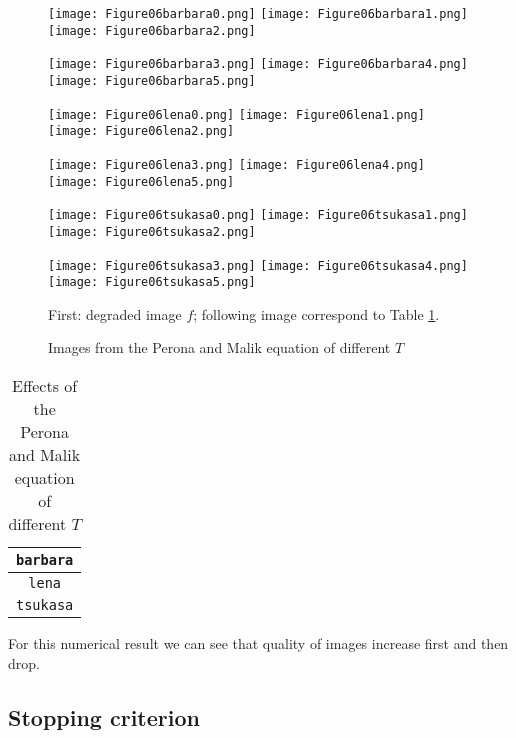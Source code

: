 \documentclass[english, nochinese]{pnote}
\begin{document}
\begin{figure}[htbp]
{
\centering

\texttt{[image: Figure06barbara0.png]}
\texttt{[image: Figure06barbara1.png]}
\texttt{[image: Figure06barbara2.png]}

\texttt{[image: Figure06barbara3.png]}
\texttt{[image: Figure06barbara4.png]}
\texttt{[image: Figure06barbara5.png]}

\texttt{[image: Figure06lena0.png]}
\texttt{[image: Figure06lena1.png]}
\texttt{[image: Figure06lena2.png]}

\texttt{[image: Figure06lena3.png]}
\texttt{[image: Figure06lena4.png]}
\texttt{[image: Figure06lena5.png]}

\texttt{[image: Figure06tsukasa0.png]}
\texttt{[image: Figure06tsukasa1.png]}
\texttt{[image: Figure06tsukasa2.png]}

\texttt{[image: Figure06tsukasa3.png]}
\texttt{[image: Figure06tsukasa4.png]}
\texttt{[image: Figure06tsukasa5.png]}

\caption{Images from the Perona and Malik equation of different $T$}
\label{Fig:PMDyn}
}
{
\footnotesize First: degraded image $f$; following image correspond to Table \ref{Tbl:PMDyn}.
}
\end{figure}

\begin{table}[htbp]
\centering
\begin{tabular}{|c|c|c|c|c|c|c|}
\hline
\multicolumn{7}{|c|}{\texttt{barbara}} \\
\hline

\multicolumn{7}{|c|}{\texttt{lena}} \\
\hline

\multicolumn{7}{|c|}{\texttt{tsukasa}} \\
\hline

\end{tabular}
\caption{Effects of the Perona and Malik equation of different $T$}
\label{Tbl:PMDyn}
\end{table}

For this numerical result we can see that quality of images increase first and then drop.

\subsection{Stopping criterion} \label{SubSec:Stop}
\end{document}
